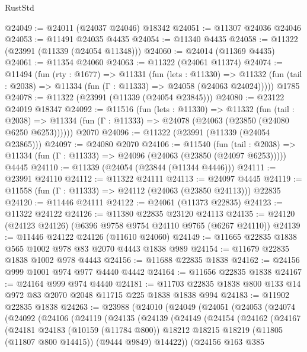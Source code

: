 \begin{lexlean}{RustStd}
\begin{coremodule}
@24049 := @24011 (@24037 @24046) @18342
@24051 := @11307 @24036 @24046
@24053 := @11491 @24035 @4435
@24054 := @11340 @4435
@24058 := @11322 (@23991 (@11339 (@24054 @11348)))
@24060 := @24014 (@11369 @4435)
@24061 := @11354 @24060
@24063 := @11322 (@24061 @11374)
@24074 := @11494
    (fun (rty : @1677) =>
    @11331
      (fun (lets : @11330) =>
      @11332 (fun (tail : @2038) => @11334 (fun (Γ : @11333) => @24058 (@24063 @24024)))))
    @1785
@24078 := @11322 (@23991 (@11339 (@24054 @23845)))
@24080 := @23122 @24019 @18347
@24092 := @11516
    (fun (lets : @11330) =>
    @11332
      (fun (tail : @2038) =>
      @11334 (fun (Γ : @11333) => @24078 (@24063 (@23850 (@24080 @6250 @6253))))))
    @2070
@24096 := @11322 (@23991 (@11339 (@24054 @23865)))
@24097 := @24080 @2070
@24106 := @11540
    (fun (tail : @2038) => @11334 (fun (Γ : @11333) => @24096 (@24063 (@23850 (@24097 @6253)))))
    @4445
@24110 := @11339 (@24054 (@23844 (@11344 @4446)))
@24111 := @23991 @24110
@24112 := @11322 @24111
@24113 := @24097 @4445
@24119 := @11558 (fun (Γ : @11333) => @24112 (@24063 (@23850 @24113))) @22835
@24120 := @11446 @24111
@24122 := @24061 (@11373 @22835)
@24123 := @11322 @24122
@24126 := @11380 @22835 @23120 @24113
@24135 := @24120 (@24123 @24126) (@6396 @9758 @9754 @24110 @9765 (@6267 @24110))
@24139 := @11446 @24122 @24126 (@11610 @24060)
@24149 := @11665 @22835 @1838 @565 @1002 @978 @83 @2070 @4443 @1838 @989
@24154 := @11679 @22835 @1838 @1002 @978 @4443
@24156 := @11688 @22835 @1838
@24162 := @24156 @999 @1001 @974 @977 @4440 @4442
@24164 := @11656 @22835 @1838
@24167 := @24164 @999 @974 @4440
@24181 := @11703 @22835 @1838 @800 @133 @14 @972 @83 @2070 @2048 @11715 @225 @1838 @1838 @994
@24183 := @11902 @22835 @1838
@24263 := @23988
    (@24010
      (@24049
        (@24051
          (@24053
            (@24074
              (@24092
                (@24106
                  (@24119
                    (@24135
                      (@24139
                        (@24149
                          (@24154
                            (@24162
                              (@24167
                                (@24181
                                  @24183
                                  (@10159 (@11784 @800))
                                  @18212
                                  @18215
                                  @18219
                                  (@11805 (@11807 @800 @14415))
                                  (@9444 @9849)
                                  @14422))
                              (@24156
                                @163
                                @385

\end{coremodule}
\end{lexlean}
